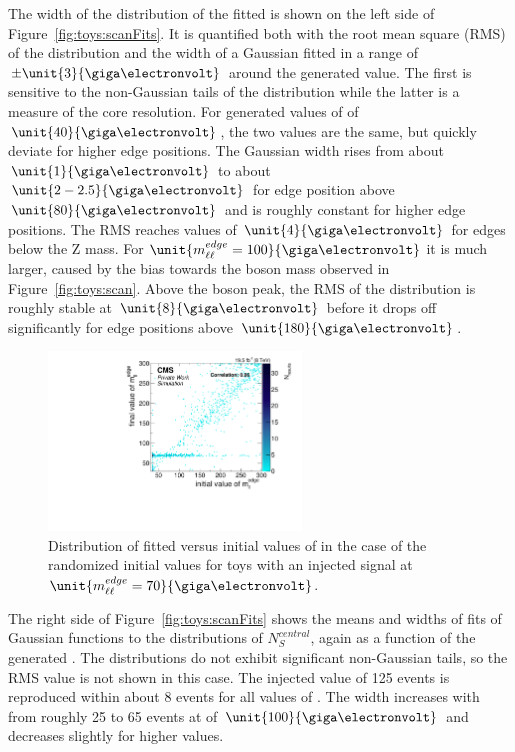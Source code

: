 The width of the distribution of the fitted \mlledge is shown on the left side of Figure~\ref{fig:toys:scanFits}. It is quantified both with the root mean square (RMS) of the distribution and the width of a Gaussian fitted in a range of $\pm\unit{3}{\giga\electronvolt}$ around the generated value. The first is sensitive to the non-Gaussian tails of the distribution while the latter is a measure of the core resolution. For generated values of \mlledge of $\unit{40}{\giga\electronvolt}$, the two values are the same, but quickly deviate for higher edge positions. The Gaussian width rises from about $\unit{1}{\giga\electronvolt}$ to about $\unit{2-2.5}{\giga\electronvolt}$ for edge position above $\unit{80}{\giga\electronvolt}$ and is roughly constant for higher edge positions. The RMS reaches values of $\unit{4}{\giga\electronvolt}$ for edges below the Z mass. For $\unit{\mlledge=100}{\giga\electronvolt}$ it is much larger, caused by the bias towards the \Z boson mass observed in Figure~\ref{fig:toys:scan}. Above the \Z boson peak, the RMS of the distribution is roughly stable at $\unit{8}{\giga\electronvolt}$ before it drops off significantly for edge positions above $\unit{180}{\giga\electronvolt}$.


\begin{figure}[hbp]
  \centering

    \includegraphics[width=0.6\textwidth]{plots/results/fit/toyResults/fittedM0vsinitialM0_signalInjectedM70N125_NegSig.pdf}
  \caption{Distribution of fitted versus initial values of \mlledge in the case of the randomized initial values for toys with an injected signal at $\unit{\mlledge = 70}{\giga\electronvolt}$.}
  \label{fig:toys:randM0Signal}
\end{figure}



The right side of Figure~\ref{fig:toys:scanFits} shows the means and widths of fits of Gaussian functions to the distributions of $N_{S}^{central}$, again as a function of the generated \mlledge. The distributions do not exhibit significant non-Gaussian tails, so the RMS value is not shown in this case. The injected value of 125 events is reproduced within about 8 events for all values of \mlledge. The width increases with \mlledge from roughly 25 to 65 events at \mlledge of $\unit{100}{\giga\electronvolt}$ and decreases slightly for higher values.

